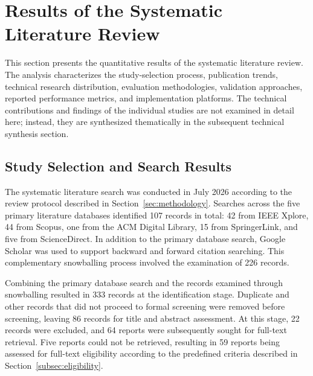\section{Results of the Systematic Literature Review}
\label{sec:results}

This section presents the quantitative results of the systematic literature
review. The analysis characterizes the study-selection process, publication
trends, technical research distribution, evaluation methodologies, validation
approaches, reported performance metrics, and implementation platforms. The
technical contributions and findings of the individual studies are not
examined in detail here; instead, they are synthesized thematically in the
subsequent technical synthesis section.

\subsection{Study Selection and Search Results}
\label{subsec:study_selection_results}

The systematic literature search was conducted in July 2026 according to the
review protocol described in Section~\ref{sec:methodology}. Searches across
the five primary literature databases identified 107 records in total:
42 from IEEE Xplore, 44 from Scopus, one from the ACM Digital Library,
15 from SpringerLink, and five from ScienceDirect. In addition to the primary
database search, Google Scholar was used to support backward and forward
citation searching. This complementary snowballing process involved the
examination of 226 records.

Combining the primary database search and the records examined through
snowballing resulted in 333 records at the identification stage. Duplicate
and other records that did not proceed to formal screening were removed before
screening, leaving 86 records for title and abstract assessment. At this
stage, 22 records were excluded, and 64 reports were subsequently sought for
full-text retrieval. Five reports could not be retrieved, resulting in
59 reports being assessed for full-text eligibility according to the
predefined criteria described in Section~\ref{subsec:eligibility}.

